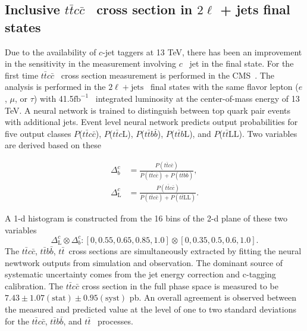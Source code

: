 \documentclass[submission, Proceedings]{SciPost}
\newcommand{\fbinv}{\ensuremath{{\text{fb}^{-1}}}{}}
\newcommand{\Pe}{\ensuremath{{e}}}
\newcommand{\PQt}{\ensuremath{{t}}}
\newcommand{\PAQt}{\ensuremath{{\bar{t}}}}
\newcommand{\PQb}{\ensuremath{{b}}}
\newcommand{\PAQb}{\ensuremath{{\bar{b}}}}
\newcommand{\PQc}{\ensuremath{{c}}}
\newcommand{\PAQc}{\ensuremath{{\bar{c}}}}
\newcommand{\ttbar}{{\PQt\PAQt}}
\newcommand{\PQtau}{\ensuremath{{\tau}}}
\newcommand{\Pmu}{\ensuremath{{\mu}}}
\newcommand{\dilep}{\ensuremath{2\ell + \text{jets}}}
\newcommand{\ttcc}{{\ttbar\PQc\PAQc}}
\newcommand{\ttcL}{{\ttbar\PQc\text{L}}}
\newcommand{\ttbb}{{\ttbar\PQb\PAQb}}
\newcommand{\ttbL}{{\ttbar\PQb\text{L}}}
\newcommand{\ttLF}{{\ttbar\text{LL}}}
\begin{document}
\subsection{Inclusive \ttcc~ cross section in $2\ell$ + jets final states}
Due to the availability of \PQc-jet taggers at 13 TeV, there has been an improvement in the 
sensitivity in the measurement involving \PQc~ jet in the final state. For the first time \ttcc~ 
cross section measurement is performed in the CMS~\cite{CMS:2020qvt}. The analysis is performed in 
the \dilep~ final states with the same flavor lepton (\Pe, \Pmu, or \PQtau) with 41.5\fbinv~ integrated 
luminosity at the center-of-mass energy of 13 TeV. A neural network is trained to distinguish 
between top quark pair events with additional jets. Event level neural network predicts output 
probabilities for five output classes $P$($\ttcc$), $P$($\ttcL$), $P$($\ttbb$), $P$($\ttbL$), and $P$($\ttLF$). Two variables are derived based on these
\begin{linenomath}
\begin{equation}
  \begin{aligned}
\Delta_{\PQb}^{\PQc} &= \frac{P(\ttcc) }{P(\ttcc) + P(\ttbb)},\\
\Delta_{\text{L}}^{\PQc} &=  \frac{P(\ttcc)}{P(\ttcc) + P(\ttLF)}.
\label{eq:Dbcdiscriminator}
  \end{aligned}
\end{equation}
\end{linenomath}
A 1-d histogram is constructed from the 16 bins of the 2-d plane of these two variables
\begin{equation}
\Delta_{\text{L}}^{\PQc} \otimes \Delta_{\PQb}^{\PQc} :  [0,0.55,0.65,0.85,1.0] \otimes [0,0.35,0.5,0.6,1.0].
\end{equation}
The \ttcc, \ttbb, \ttLF~cross sections are simultaneously extracted by fitting the neural newtwork
outputs from simulation and observation. The dominant source of systematic uncertainty comes 
from the jet energy correction and c-tagging calibration. The $\ttcc$ cross section in the
full phase space is measured to be $7.43\pm 1.07(\text{stat})\pm 0.95(\text{syst})$ pb. 
An overall agreement is observed between the measured and predicted value at the level of 
one to two standard deviations for the \ttcc, \ttbb, and \ttLF~ processes. 
\end{document}

